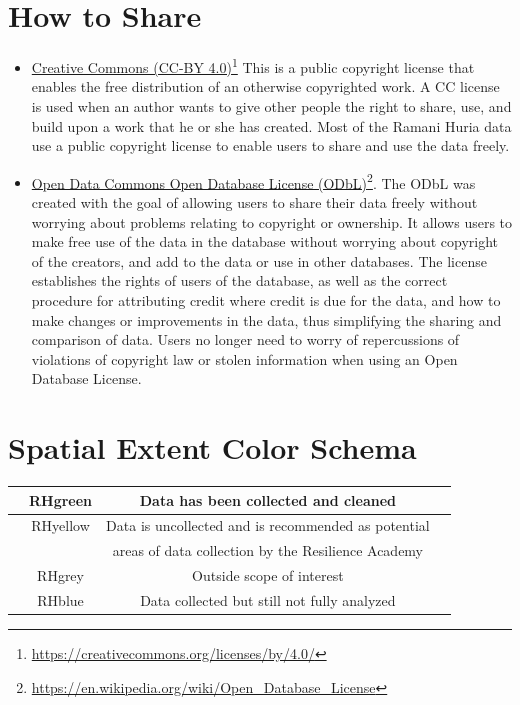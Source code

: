 \documentclass[a4paper,12pt,twoside]{article}
\begin{document}
\section{How to Share}
\begin{itemize}
    \item
    \href{https://creativecommons.org/licenses/by/4.0/}{Creative Commons (CC-BY 4.0)}\footnote{\url{https://creativecommons.org/licenses/by/4.0/}}
This is a public copyright license that enables the free distribution of an otherwise copyrighted work. A CC license is used when an author wants to give other people the right to share, use, and build upon a work that he or she has created. Most of the Ramani Huria data use a public copyright license to enable users to share and use the data freely.

\item 
\href{https://en.wikipedia.org/wiki/Open_Database_License}{Open Data Commons Open Database License (ODbL)}\footnote{\url{https://en.wikipedia.org/wiki/Open_Database_License}}.
The ODbL was created with the goal of allowing users to share their data freely without worrying about problems relating to copyright or ownership. It allows users to make free use of the data in the database without worrying about copyright of the creators, and add to the data or use in other databases. The license establishes the rights of users of the database, as well as the correct procedure for attributing credit where credit is due for the data, and how to make changes or improvements in the data, thus simplifying the sharing and comparison of data. Users no longer need to worry of repercussions of violations of copyright law or stolen information when using an Open Database License.

\end{itemize}

\section{Spatial Extent Color Schema}

\begin{tabular}{|c|c|c|c|}
\hline
{\colorbox{RHgreen}{   }} & RHgreen & Data has been collected and cleaned\\
\hline
{\colorbox{RHyellow}{   }} & RHyellow & Data is uncollected and is recommended as potential\\
{} & {} & areas of data collection by the Resilience Academy\\
\hline
{\colorbox{RHgrey}{   }} & RHgrey & Outside scope of interest\\
\hline
{\colorbox{RHblue}{   }} & RHblue & Data collected but still not fully analyzed\\
\hline
\end{tabular}
\end{document}
